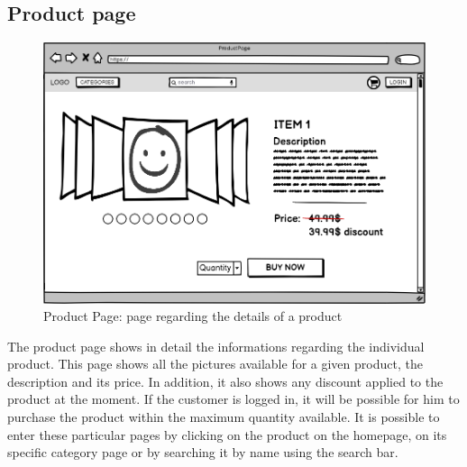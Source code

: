 \subsection{Product page}
    \begin{figure}[H]
        \centering
        \includegraphics[width=\textwidth,height=0.7\textheight,keepaspectratio]{mockups/productPageMockup.png}
            \caption{Product Page: page regarding the details of a product}
            \label{fig:ProductPage}
    \end{figure}

The product page shows in detail the informations regarding the individual product.
This page shows all the pictures available for a given product, the description and its price.
In addition, it also shows any discount applied to the product at the moment.
If the customer is logged in, it will be possible for him to purchase the product within the maximum quantity available. It is possible to enter these particular pages by clicking on the product on the homepage, on its specific category page or by searching it by name using the search bar.

